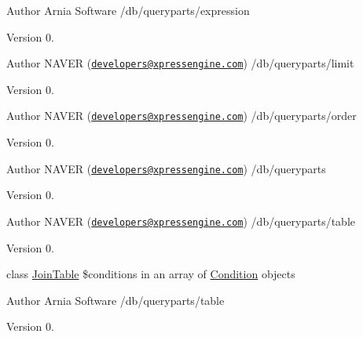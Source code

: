 \begin{DoxyAuthor}{Author}
Arnia Software /db/queryparts/expression 
\end{DoxyAuthor}
\begin{DoxyVersion}{Version}
0.
\end{DoxyVersion}
\begin{DoxyAuthor}{Author}
N\+A\+V\+E\+R (\href{mailto:developers@xpressengine.com}{\tt developers@xpressengine.\+com}) /db/queryparts/limit 
\end{DoxyAuthor}
\begin{DoxyVersion}{Version}
0.
\end{DoxyVersion}
\begin{DoxyAuthor}{Author}
N\+A\+V\+E\+R (\href{mailto:developers@xpressengine.com}{\tt developers@xpressengine.\+com}) /db/queryparts/order 
\end{DoxyAuthor}
\begin{DoxyVersion}{Version}
0.
\end{DoxyVersion}
\begin{DoxyAuthor}{Author}
N\+A\+V\+E\+R (\href{mailto:developers@xpressengine.com}{\tt developers@xpressengine.\+com}) /db/queryparts 
\end{DoxyAuthor}
\begin{DoxyVersion}{Version}
0.
\end{DoxyVersion}
\begin{DoxyAuthor}{Author}
N\+A\+V\+E\+R (\href{mailto:developers@xpressengine.com}{\tt developers@xpressengine.\+com}) /db/queryparts/table 
\end{DoxyAuthor}
\begin{DoxyVersion}{Version}
0.
\end{DoxyVersion}
class \hyperlink{classJoinTable}{Join\+Table} \$conditions in an array of \hyperlink{classCondition}{Condition} objects

\begin{DoxyAuthor}{Author}
Arnia Software /db/queryparts/table 
\end{DoxyAuthor}
\begin{DoxyVersion}{Version}
0.
\end{DoxyVersion}

